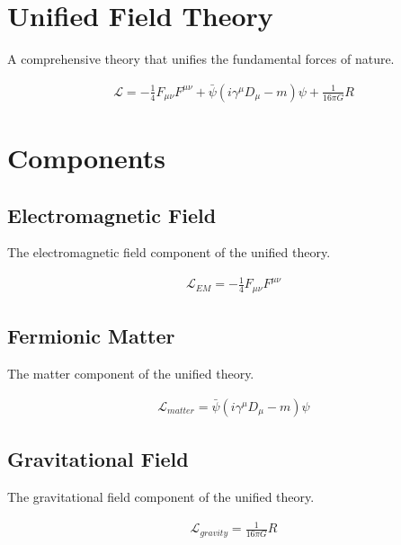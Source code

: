 \documentclass{article}
\begin{document}
\section*{Unified Field Theory}

A comprehensive theory that unifies the fundamental forces of nature.

\begin{align}
\mathcal{L} = -\frac{1}{4}F_{\mu\nu}F^{\mu\nu} + \bar{\psi}(i\gamma^\mu D_\mu - m)\psi + \frac{1}{16\pi G}R
\end{align}

\section*{Components}


\subsection*{Electromagnetic Field}

The electromagnetic field component of the unified theory.

\begin{align}
\mathcal{L}_{EM} = -\frac{1}{4}F_{\mu\nu}F^{\mu\nu}
\end{align}

\subsection*{Fermionic Matter}

The matter component of the unified theory.

\begin{align}
\mathcal{L}_{matter} = \bar{\psi}(i\gamma^\mu D_\mu - m)\psi
\end{align}

\subsection*{Gravitational Field}

The gravitational field component of the unified theory.

\begin{align}
\mathcal{L}_{gravity} = \frac{1}{16\pi G}R
\end{align}
\end{document}
